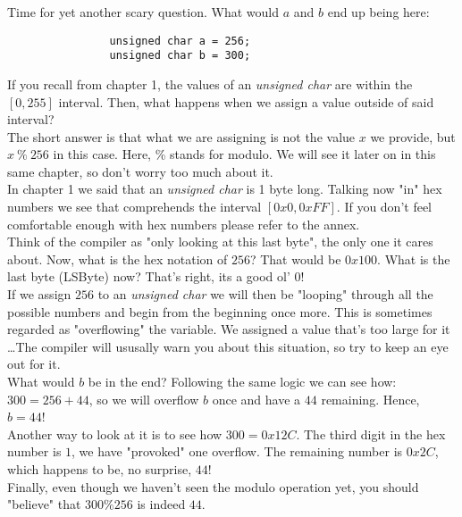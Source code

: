 \documentclass[12pt]{book}
\begin{document}
            Time for yet another scary question. What would $a$ and $b$ end up being here:

            \begin{verbatim}
                unsigned char a = 256;
                unsigned char b = 300;
            \end{verbatim}

            If you recall from chapter 1, the values of an \textit{unsigned char} are within the $[0, 255]$ interval. Then, what happens when we assign a value outside of said interval? \\

            The short answer is that what we are assigning is not the value $x$ we provide, but $x\ \% \ 256$ in this case. Here, \% stands for modulo. We will see it later on in this same chapter, so don't worry too much about it. \\

            In chapter 1 we said that an \textit{unsigned char} is 1 byte long. Talking now "in" hex numbers we see that comprehends the interval $[0x0, 0xFF]$. If you don't feel comfortable enough with hex numbers please refer to the annex. \\

            Think of the compiler as "only looking at this last byte", the only one it cares about. Now, what is the hex notation of $256$? That would be $0x100$. What is the last byte (LSByte) now? That's right, its a good ol' $0$! \\

            If we assign $256$ to an \textit{unsigned char} we will then be "looping" through all the possible numbers and begin from the beginning once more. This is sometimes regarded as "overflowing" the variable. We assigned a value that's too large for it \dots The compiler will ususally warn you about this situation, so try to keep an eye out for it. \\

            What would $b$ be in the end? Following the same logic we can see how: $300 = 256 + 44$, so we will overflow $b$ once and have a $44$ remaining. Hence, $b = 44$! \\

            Another way to look at it is to see how $300 = 0x12C$. The third digit in the hex number is $1$, we have "provoked" one overflow. The remaining number is $0x2C$, which happens to be, no surprise, $44$! \\

            Finally, even though we haven't seen the modulo operation yet, you should "believe" that $300 \% 256$ is indeed $44$.
\end{document}
